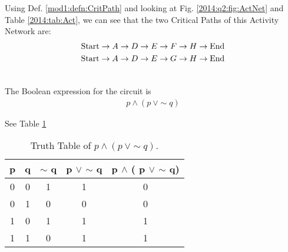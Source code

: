 \begin{subquestions}
\begin{subsubquestions}

\subsubquestion

Using Def. \ref{mod1:defn:CritPath} and looking at Fig. \ref{2014:q2:fig:ActNet} and Table \ref{2014:tab:Act}, we can see that the two Critical Paths of this Activity Network are:
\begin{align}
	\text{Start} \rightarrow A \rightarrow D \rightarrow E \rightarrow F \rightarrow H \rightarrow \text{End} \nonumber \\
	\text{Start} \rightarrow A \rightarrow D \rightarrow E \rightarrow G \rightarrow H \rightarrow \text{End} \nonumber \\ \nonumber
\end{align}
	
\end{subsubquestions}


\subquestion

\begin{subsubquestions}
	
\subsubquestion

The Boolean expression for the circuit is 
\begin{align}
	p \wedge (p \: \vee \sim q) \label{2014:q2:eqn:Bool}
\end{align}


\subsubquestion

See Table \ref{2014:tab:TrthTab}
\begin{table}[ht]
	\centering
	\begin{tabular}{|c|c|c|c|c|}
		\hline
		p&q& $\sim$ q & p $\vee$ $\sim$ q& p $\wedge$ ( p $\vee$ $\sim$ q) \\
		\hline
		0 & 0 & 1 & 1 & 0 \\
		0 & 1 & 0 & 0 & 0 \\
		1 & 0 & 1 & 1 & 1 \\
		1 & 1 & 0 & 1 & 1 \\
		\hline
	\end{tabular}
	\caption{\label{2014:tab:TrthTab}Truth Table of $p \land (p ~\lor \sim q)$.}
\end{table}

\end{subsubquestions}

\end{subquestions}
